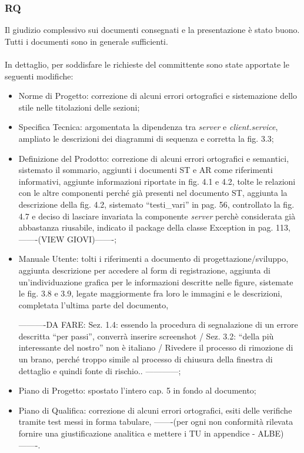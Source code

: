 \subsubsection*{RQ}
Il giudizio complessivo sui documenti consegnati e la presentazione \`e stato
buono. Tutti i documenti sono in generale sufficienti.  \\ \\ In dettaglio, per
soddisfare le richieste del committente sono state apportate le seguenti modifiche:
\begin{itemize}
  \item Norme di Progetto: correzione di alcuni errori ortografici e
  sistemazione dello stile nelle titolazioni delle sezioni;
  \item Specifica Tecnica: argomentata la dipendenza tra \emph{server} e
  \emph{client.service}, ampliato le descrizioni dei diagrammi di sequenza e
  corretta la fig. 3.3;
  \item Definizione del Prodotto: correzione di alcuni errori
  ortografici e semantici, sistemato il sommario, aggiunti i documenti ST e AR
  come riferimenti informativi, aggiunte informazioni riportate in fig. 4.1 e
  4.2, tolte le relazioni con le altre componenti perch\'e gi\`a presenti nel
  documento ST, aggiunta la descrizione della fig. 4.2, sistemato
  ``testi\_vari'' in pag. 56, controllato la fig. 4.7 e deciso di
  lasciare invariata la componente \emph{server} perch\`e considerata gi\`a
  abbastanza riusabile, indicato il package della classe Exception
  in pag. 113, -------(VIEW GIOVI)-------;
  \item Manuale Utente: tolti i riferimenti a documento di
  progettazione/sviluppo, aggiunta descrizione per accedere al form di
  registrazione, aggiunta di un'individuazione grafica per le informazioni
  descritte nelle figure, sistemate le fig. 3.8 e 3.9, legate maggiormente fra
  loro le immagini e le descrizioni, completata l'ultima parte del documento,
  
  ----------DA FARE: Sez. 1.4: essendo la procedura di segnalazione di un errore
  descritta ``per passi'', converr\`a inserire screenshot / Sez. 3.2: ``della
  pi\`u interessante del nostro'' non \`e italiano / Rivedere il processo di
  rimozione di un brano, perch\'e troppo simile al processo di chiusura della
  finestra di dettaglio e quindi fonte di rischio.. ------------;
  \item Piano di Progetto: spostato l'intero cap. 5 in fondo al documento;
  \item Piano di Qualifica: correzione di alcuni errori ortografici, esiti delle
  verifiche tramite test messi in forma tabulare,
   -------(per ogni non
  conformit\`a rilevata fornire una giustificazione analitica e mettere i TU in
  appendice - ALBE)-------.
\end{itemize}

